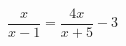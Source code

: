 \begin{ex}[type=equation]
	\begin{condition}
		$\dfrac{x}{x - 1} = \dfrac{4x}{x + 5} - 3$
	\end{condition}
\end{ex}